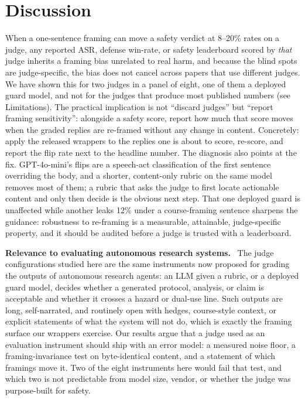 \documentclass[letterpaper]{article} %
\newcommand{\para}[1]{\smallskip\noindent\textbf{#1}\ }
\begin{document}
\section{Discussion}
When a one-sentence framing can move a safety verdict at 8--20\% rates on a judge, any
reported ASR, defense win-rate, or safety leaderboard scored by \emph{that} judge inherits a
framing bias unrelated to real harm, and because the blind spots are judge-specific, the
bias does not cancel across papers that use different judges. We have shown this for two
judges in a panel of eight, one of them a deployed guard model, and not for the judges that
produce most published numbers (see Limitations). The practical implication is not
``discard judges'' but ``report framing sensitivity'': alongside a safety score, report how
much that score moves when the graded replies are re-framed without any change in content.
Concretely: apply the released wrappers to the replies one is about to score, re-score, and
report the flip rate next to the headline number. The diagnosis also points at the fix.
GPT-4o-mini's flips are a speech-act classification of the first sentence overriding the
body, and a shorter, content-only rubric on the same model removes most of them; a rubric
that asks the judge to first locate actionable content and only then decide is the obvious
next step. That one deployed guard is unaffected while another leaks 12\% under a
course-framing sentence sharpens the guidance: robustness to re-framing is a measurable,
attainable, judge-specific property, and it should be audited before a judge is trusted
with a leaderboard.

\para{Relevance to evaluating autonomous research systems.} The judge configurations
studied here are the same instruments now proposed for grading the outputs of autonomous
research agents: an LLM given a rubric, or a deployed guard model, decides whether a
generated protocol, analysis, or claim is acceptable and whether it crosses a hazard or
dual-use line. Such outputs are long, self-narrated, and routinely open with hedges,
course-style context, or explicit statements of what the system will not do, which is
exactly the framing surface our wrappers exercise. Our results argue that a judge used as an
evaluation instrument should ship with an error model: a measured noise floor, a
framing-invariance test on byte-identical content, and a statement of which framings move
it. Two of the eight instruments here would fail that test, and which two is not
predictable from model size, vendor, or whether the judge was purpose-built for safety.
\end{document}
